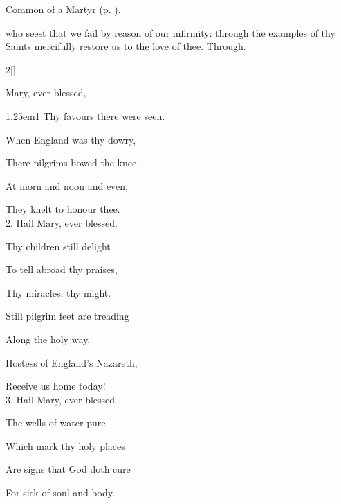 
\begin{rubric}
	Common of a Martyr (p. \pageref{CommonMartyr}).
\end{rubric}

{} who seest that we fail by reason of our infirmity: through the examples of thy Saints mercifully restore us to the love of thee. Through.



\clearpage
{}

\begin{paracol}{2}[]
\sloppy

\firstEvensong

\firstEvensongHymn
{} Mary, ever blessed,



\begin{hangparas}{1.25em}{1}
Thy favours there were seen.

When England was thy dowry,

There pilgrims bowed the knee.

At morn and noon and even,

They knelt to honour thee.\\

2. Hail Mary, ever blessed.

Thy children still delight

To tell abroad thy praises,

Thy miracles, thy might.

Still pilgrim feet are treading

Along the holy way.

Hostess of England's Nazareth,

Receive us home today!\\

3. Hail Mary, ever blessed.

The wells of water pure

Which mark thy holy places

Are signs that God doth cure

For sick of soul and body.


\end{hangparas}
\end{paracol}

